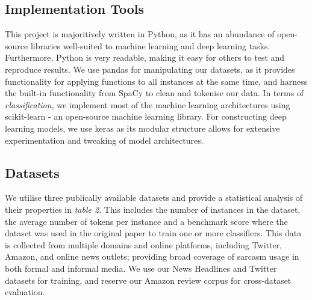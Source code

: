 \documentclass[12pt,a4paper]{article}
\begin{document}
\subsection{Implementation Tools}\vspace{-4.2pt}
\noindent This project is majoritively written in Python, as it has an abundance of open-source libraries well-suited to machine learning and deep learning tasks. Furthermore, Python is very readable, making it easy for others to test and reproduce results. We use pandas for manipulating our datasets, as it provides functionality for applying functions to all instances at the same time, and harness the built-in functionality from SpaCy to clean and tokenise our data. In terms of \textit{classification}, we implement most of the machine learning architectures using scikit-learn - an open-source machine learning library. For constructing deep learning models, we use keras as its modular structure allows for extensive experimentation and tweaking of model architectures.

\subsection{Datasets}
\vspace{-4.2pt}\noindent We utilise three publically available datasets and provide a statistical analysis of their properties in \textit{table 2}. This includes the number of instances in the dataset, the average number of tokens per instance and a benchmark score where the dataset was used in the original paper to train one or more classifiers. This data is collected from multiple domains and online platforms, including Twitter, Amazon, and online news outlets; providing broad coverage of sarcasm usage in both formal and informal media. We use our News Headlines and Twitter datasets for training, and reserve our Amazon review corpus for cross-dataset evaluation.\vspace{-5pt}
\end{document}
